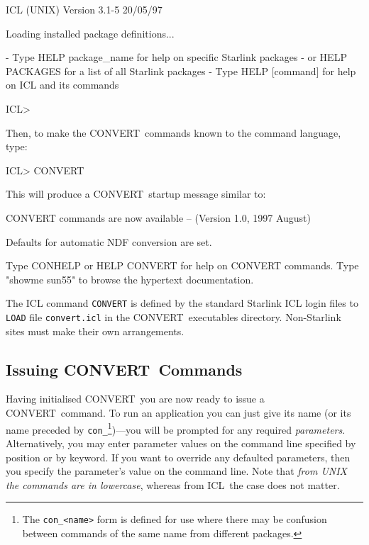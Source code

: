 \documentclass[twoside,11pt]{starlink}
\providecommand{\CONVERT}{{\footnotesize CONVERT}}
\providecommand{\BCONVERT}{{\normalsize CONVERT}}
\providecommand{\ICL}{{\footnotesize ICL}}
\begin{document}
\begin{terminalv}
ICL (UNIX) Version 3.1-5 20/05/97

Loading installed package definitions...

  - Type HELP package_name for help on specific Starlink packages
  -   or HELP PACKAGES for a list of all Starlink packages
  - Type HELP [command] for help on ICL and its commands

ICL>
\end{terminalv}

Then, to make the \CONVERT\ commands known to the command language, type:

\begin{terminalv}
ICL> CONVERT
\end{terminalv}

This will produce a \CONVERT\ startup message similar to:

\begin{terminalv}
CONVERT commands are now available -- (Version 1.0, 1997 August)

Defaults for automatic NDF conversion are set.

Type CONHELP or HELP CONVERT for help on CONVERT commands.
Type "showme sun55" to browse the hypertext documentation.
\end{terminalv}


The ICL command \texttt{CONVERT} is defined by the standard Starlink ICL login
files to \texttt{LOAD} file \texttt{convert.icl} in the \CONVERT\ executables
directory. Non-Starlink sites must make their own arrangements.

\subsection[Issuing {\small CONVERT} Commands]
{
Issuing \BCONVERT\ Commands}
Having initialised \CONVERT\ you are now ready to issue a
\CONVERT\ command. To run an application you can just give
its name (or its name preceded by \texttt{con\_}\footnote{The
\texttt{con\_<name>}
form is defined for use where there may be confusion between commands of the
same name from different packages.})---you will be prompted for any required
\emph{parameters}.
Alternatively, you may enter parameter values on the command line
specified by position or by keyword.  If you want to override any
defaulted parameters, then you specify the parameter's value on the
command line.  Note that \emph{from UNIX the commands are in lowercase}, whereas
from \ICL\ the case does not matter.
\end{document}

